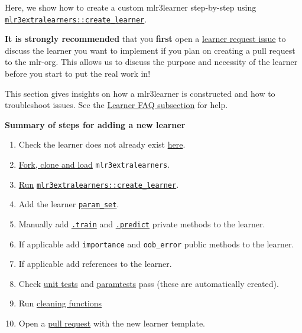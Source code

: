 \documentclass[
]{scrbook}
\providecommand{\tightlist}{%
  \setlength{\itemsep}{0pt}\setlength{\parskip}{0pt}}
\begin{document}
Here, we show how to create a custom mlr3learner step-by-step using \href{https://mlr3extralearners.mlr-org.com/reference/create_learner.html}{\texttt{mlr3extralearners::create\_learner}}.

\textbf{It is strongly recommended} that you \textbf{first} open a \href{https://github.com/mlr-org/mlr3extralearners/issues/new?assignees=\&labels=new+learner\&template=learner-request-template.md\&title=\%5BLRNRQ\%5D+Add+\%3Calgorithm\%3E+from+package+\%3Cpackage\%3E}{learner request issue} to discuss the learner you want to implement if you plan on creating a pull request to the mlr-org. This allows us to discuss the purpose and necessity of the learner before you start to put the real work in!

This section gives insights on how a mlr3learner is constructed and how to troubleshoot issues.
See the \protect\hyperlink{learner-faq}{Learner FAQ subsection} for help.

\textbf{Summary of steps for adding a new learner}

\begin{enumerate}
\def\labelenumi{\arabic{enumi}.}
\tightlist
\item
  Check the learner does not already exist \href{https://mlr3extralearners.mlr-org.com/articles/learners/list_learners.html}{here}.
\item
  \protect\hyperlink{setup}{Fork, clone and load} \texttt{mlr3extralearners}.
\item
  \protect\hyperlink{create-learner}{Run} \href{https://mlr3extralearners.mlr-org.com/reference/create_learner.html}{\texttt{mlr3extralearners::create\_learner}}.
\item
  Add the learner \protect\hyperlink{param-set}{\texttt{param\_set}}.
\item
  Manually add \protect\hyperlink{learner-train}{\texttt{.train}} and \protect\hyperlink{learner-predict}{\texttt{.predict}} private methods to the learner.
\item
  If applicable add \texttt{importance} and \texttt{oob\_error} public methods to the learner.
\item
  If applicable add references to the learner.
\item
  Check \protect\hyperlink{learner-test}{unit tests} and \protect\hyperlink{learner-test}{paramtests} pass (these are automatically created).
\item
  Run \protect\hyperlink{cleaning}{cleaning functions}
\item
  Open a \href{https://github.com/mlr-org/mlr3extralearners/pulls}{pull request} with the new learner template.
\end{enumerate}
\end{document}
